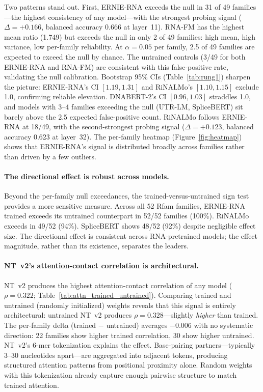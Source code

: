 \documentclass[11pt]{article}
\begin{document}
Two patterns stand out. First, ERNIE-RNA exceeds the null in 31 of
49 families---the highest consistency of any model---with the
strongest probing signal ($\Delta = +0.166$, balanced accuracy 0.666
at layer~11). RNA-FM has the highest mean ratio (1.749) but exceeds
the null in only 2 of 49 families: high mean, high variance, low
per-family reliability. At $\alpha = 0.05$ per family, 2.5 of 49
families are expected to exceed the null by chance. The untrained
controls (3/49 for both ERNIE-RNA and RNA-FM) are consistent with
this false-positive rate, validating the null calibration.
Bootstrap 95\% CIs (Table~\ref{tab:rung1}) sharpen the picture:
ERNIE-RNA's CI $[1.19, 1.31]$ and RiNALMo's $[1.10, 1.15]$ exclude
1.0, confirming reliable elevation. DNABERT-2's CI $[0.96, 1.03]$
straddles 1.0, and models with 3--4 families exceeding the null
(UTR-LM, SpliceBERT) sit barely above the 2.5 expected false-positive
count. RiNALMo follows ERNIE-RNA at 18/49, with the second-strongest
probing signal ($\Delta = +0.123$, balanced accuracy 0.623 at
layer~32). The per-family heatmap
(Figure~\ref{fig:heatmap}) shows that ERNIE-RNA's signal is
distributed broadly across families rather than driven by a few
outliers.

\paragraph{The directional effect is robust across models.}
Beyond the per-family null exceedances, the trained-versus-untrained
sign test provides a more sensitive measure. Across all 52 Rfam
families, ERNIE-RNA trained exceeds its untrained counterpart in
52/52 families (100\%). RiNALMo exceeds in 49/52 (94\%). SpliceBERT
shows 48/52 (92\%) despite negligible effect size. The directional
effect is consistent across RNA-pretrained models; the effect
magnitude, rather than its existence, separates the leaders.

\paragraph{NT~v2's attention-contact correlation is architectural.}
NT~v2 produces the highest attention-contact correlation of any model
($\rho = 0.322$; Table~\ref{tab:attn_trained_untrained}). Comparing
trained and untrained (randomly initialized) weights reveals that this
signal is entirely architectural: untrained NT~v2 produces
$\rho = 0.328$---slightly \emph{higher} than trained.
The per-family delta (trained $-$ untrained) averages $-0.006$
with no systematic direction: 22 families show higher trained
correlation, 30 show higher untrained. NT~v2's 6-mer tokenization
explains the effect. Base-pairing partners---typically 3--30
nucleotides apart---are aggregated into adjacent tokens, producing
structured attention patterns from positional proximity alone. Random
weights with this tokenization already capture enough pairwise
structure to match trained attention.
\end{document}
